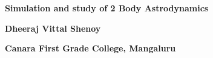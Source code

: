 \begin{titlepage}
    
    \begin{center}
        \vspace*{1cm}

        \LARGE
        \textbf{Simulation and study of 2 Body Astrodynamics}

        \vspace{4cm}

        \textbf{Dheeraj Vittal Shenoy}

        \vfill

        \vspace{0.8cm}

        \Large
        \textbf{Canara First Grade College, Mangaluru}

    \end{center}

\end{titlepage}
